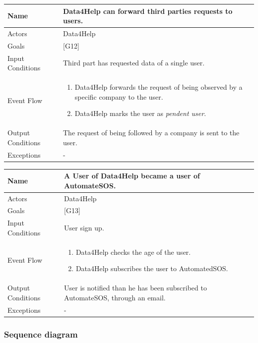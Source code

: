 \documentclass{article}
\begin{document}
\begin{center}
    \begin{tabular}{ | l | p{10cm} |}
    \hline
    Name & Data4Help can forward third parties requests to users. \\ \hline
    Actors & Data4Help\\ \hline
   	Goals & {[G12]}\\ \hline
    Input Conditions & Third part has requested data of a single user.\\ \hline
    Event Flow & \begin{enumerate}
    	\item Data4Help forwards the request of being observed by a specific company to the user.
    	\item Data4Help marks the user as \emph{pendent user}.
    \end{enumerate} \\ \hline
    Output Conditions & The request of being followed by a company is sent to the user. \\ \hline
    Exceptions & -    \\ \hline
    \end{tabular}
\end{center}


\begin{center}
    \begin{tabular}{ | l | p{10cm} |}
    \hline
    Name & A User of Data4Help became a user of AutomateSOS. \\ \hline
    Actors & Data4Help\\ \hline
   	Goals & {[G13]}\\ \hline
    Input Conditions & User sign up.\\ \hline
    Event Flow & \begin{enumerate}
    	\item Data4Help checks the age of the user.
    	\item Data4Help subscribes the user to AutomatedSOS.
    \end{enumerate} \\ \hline
    Output Conditions & User is notified than he has been subscribed to AutomateSOS, through an email. \\ \hline
    Exceptions & -  \\ \hline
    \end{tabular}
\end{center}\newpage

\subsubsection{Sequence diagram}
\end{document}
